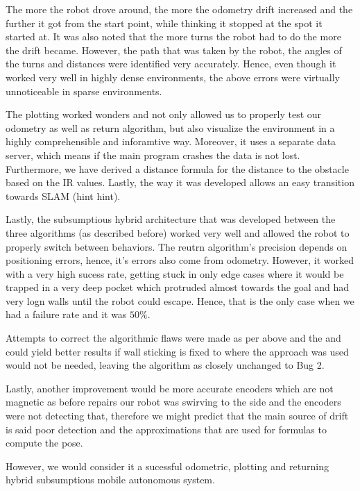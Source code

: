 \documentclass[11pt, a4paper]{article}
\begin{document}
The more the robot drove around, the more the odometry drift increased and the further it got from the 
start point, while thinking it stopped at the spot it started at. It was also noted that the more 
turns the robot had to do the more the drift became. However, the path that was taken by the robot,
the angles of the turns and distances were identified very accurately. Hence, even though it worked very 
well in highly dense environments, the above errors were virtually unnoticeable in sparse environments.

The plotting worked wonders and not only allowed us to properly test our odometry as well as return algorithm,
but also visualize the environment in a highly comprehensible and inforamtive way. Moreover, it uses a separate
data server, which means if the main program crashes the data is not lost. Furthermore, we have derived a 
distance formula for the distance to the obstacle based on the IR values. Lastly, the way it was developed 
allows an easy transition towards SLAM (hint hint).

Lastly, the subsumptious hybrid architecture that was developed between the three algorithms (as described
before) worked very well and allowed the robot to properly switch between behaviors. The reutrn algorithm's precision
depends on positioning errors, hence, it's errors also come from odometry. However, it worked with a
very high sucess rate, getting stuck in only edge cases where it would be trapped in a very deep pocket which
protruded almost towards the goal and had very logn walls until the robot could escape. Hence, that is the only case
when we had a failure rate and it was $50\%$.

\label{Discussion}

Attempts to correct the algorithmic flaws were made as per above and the %
and could yield better results if wall sticking is fixed to where the approach was used
would not be needed, leaving the algorithm as closely unchanged to Bug 2.

Lastly, another improvement would be more accurate encoders which are not magnetic as before repairs
our robot was swirving to the side and the encoders were not detecting that, therefore we might predict
that the main source of drift is said poor detection and the approximations that are used for formulas
to compute the pose.


However, we would consider it a sucessful odometric, plotting and returning hybrid subsumptious 
mobile autonomous system. 
\end{document}
